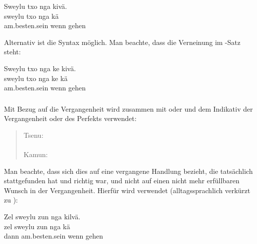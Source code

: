 \begin{interlin}
	\glll \Npawl{}Sweylu txo nga kivä. \\
	sweylu txo nga kä \\
	am.besten.sein wenn  gehen \\
\end{interlin}

\noindent Alternativ ist die Syntax  möglich. Man beachte, dass die Verneinung im -Satz steht: 

\begin{interlin}
	\glll \Npawl{}Sweylu txo nga ke kivä. \\
	sweylu txo nga ke kä \\
	am.besten.sein wenn   gehen \\
\end{interlin}

\pagebreak

\subsubsection{} Mit Bezug auf die Vergangenheit wird  zusammen mit  oder  und dem Indikativ der Vergangenheit oder des Perfekts verwendet:

\begin{quotation}
	\noindent Tsenu:  \\
	\indent{} \\
	\noindent Kamun: \\
	\indent{}
\end{quotation}

\noindent Man beachte, dass sich dies auf eine vergangene Handlung bezieht, die tatsächlich stattgefunden hat und richtig war, und nicht auf einen nicht mehr erfüllbaren Wunsch in der Vergangenheit. Hierfür wird  verwendet (alltagssprachlich verkürzt zu ):

\begin{interlin}
	\glll \Npawl{}Zel sweylu zun nga kilvä. \\
	zel sweylu zun nga kä \\
	dann am.besten.sein wenn  gehen \\
\end{interlin}

